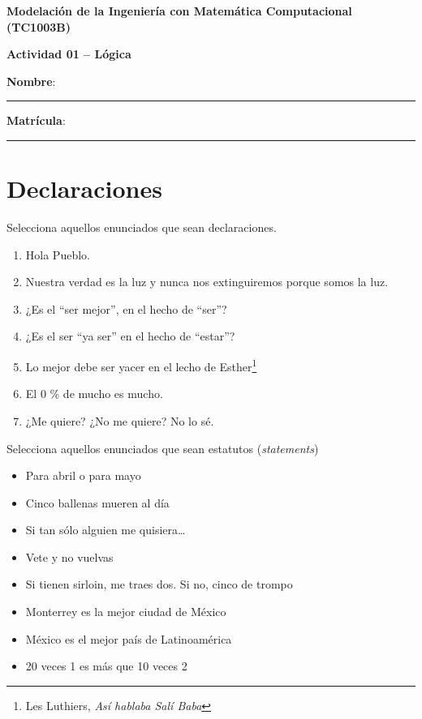 \documentclass[spanish, 10pt]{article}
\begin{document}
\begin{center}
	{\Large \textbf{Modelación de la Ingeniería con Matemática Computacional (TC1003B)}}
	
	\bigskip
	{\large \textbf{Actividad 01 -- Lógica}}
\end{center}

\bigskip
{\large \textbf{Nombre}: \rule{13.7 cm}{0.4mm}}



\bigskip
{\large \textbf{Matrícula}: \rule{5 cm}{0.4mm}} %

\bigskip


\section{Declaraciones}

Selecciona aquellos enunciados que sean declaraciones.

\vspace{3ex}

\begin{enumerate}
    \itemsep2ex
    \item Hola Pueblo.
    \item Nuestra verdad es la luz y nunca nos extinguiremos porque somos la luz.
    \item ¿Es el ``ser mejor'', en el hecho de ``ser''?
    \item ¿Es el ser ``ya ser'' en el hecho de ``estar''?
    \item Lo mejor debe ser yacer en el lecho de Esther\footnote{Les Luthiers, \textit{Así hablaba Salí Baba}}
    \item El 0 \% de mucho es mucho.
    \item ¿Me quiere? ¿No me quiere? No lo sé.
\end{enumerate}

\bigskip

Selecciona aquellos enunciados que sean estatutos (\textit{statements})

\begin{itemize}
    \item Para abril o para mayo
    \item Cinco ballenas mueren al día
    \item Si tan sólo alguien me quisiera\dots
    \item Vete y no vuelvas
    \item Si tienen sirloin, me traes dos. Si no, cinco de trompo
    \item Monterrey es la mejor ciudad de México
    \item México es el mejor país de Latinoamérica
    \item 20 veces 1 es más que 10 veces 2
\end{itemize}
\end{document}
